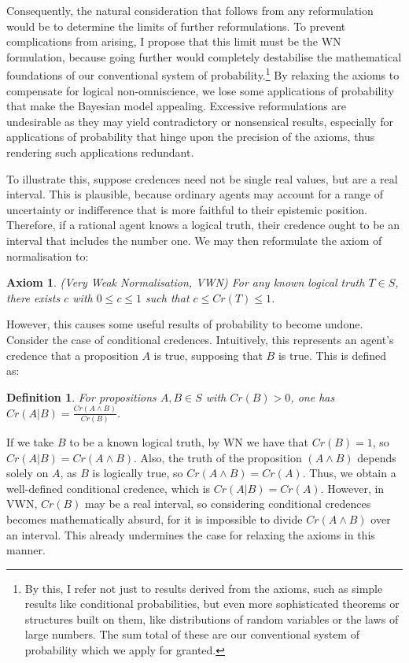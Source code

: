 \documentclass[12pt]{article}
\newtheorem{definition}{Definition}
\newtheorem{axiom}{Axiom}
\begin{document}
Consequently, the natural consideration that follows from any reformulation would be to determine the limits of further reformulations. To prevent complications from arising, I propose that this limit must be the WN formulation, because going further would completely destabilise the mathematical foundations of our conventional system of probability.\footnote{By this, I refer not just to results derived from the axioms, such as simple results like conditional probabilities, but even more sophisticated theorems or structures built on them, like distributions of random variables or the laws of large numbers. The sum total of these are our conventional system of probability which we apply for granted.}  By relaxing the axioms to compensate for logical non-omniscience, we lose some applications of probability that make the Bayesian model appealing.\autocite[436]{oup} Excessive reformulations are undesirable as they may yield contradictory or nonsensical results, especially for applications of probability that hinge upon the precision of the axioms, thus rendering such applications redundant.

To illustrate this, suppose credences need not be single real values, but are a real interval. This is plausible, because ordinary agents may account for a range of uncertainty or indifference that is more faithful to their epistemic position. Therefore, if a rational agent knows a logical truth, their credence ought to be an interval that includes the number one.\autocite{sep} We may then reformulate the axiom of normalisation to:
\begin{axiom}
    (Very Weak Normalisation, VWN) For any known logical truth $T\in S$, there exists $c$ with $0\leq c\leq 1$ such that $c\leq Cr(T)\leq1$.
\end{axiom}
However, this causes some useful results of probability to become undone. Consider the case of conditional credences. Intuitively, this represents an agent's credence that a proposition $A$ is true, supposing that $B$ is true.\autocite[32]{bdrc} This is defined as:
\begin{definition}
    For propositions $A,B\in S$ with $Cr(B)>0$, one has $Cr(A|B)=\frac{Cr(A\land B)}{Cr(B)}$.
\end{definition}
If we take $B$ to be a known logical truth, by WN we have that $Cr(B)=1$, so $Cr(A|B)=Cr(A\land B)$. Also, the truth of the proposition $(A\land B)$ depends solely on $A$, as $B$ is logically true, so $Cr(A\land B)=Cr(A)$. Thus, we obtain a well-defined conditional credence, which is $Cr(A|B)=Cr(A)$. However, in VWN, $Cr(B)$ may be a real interval, so considering conditional credences becomes mathematically absurd, for it is impossible to divide $Cr(A\land B)$ over an interval. This already undermines the case for relaxing the axioms in this manner.
\end{document}
